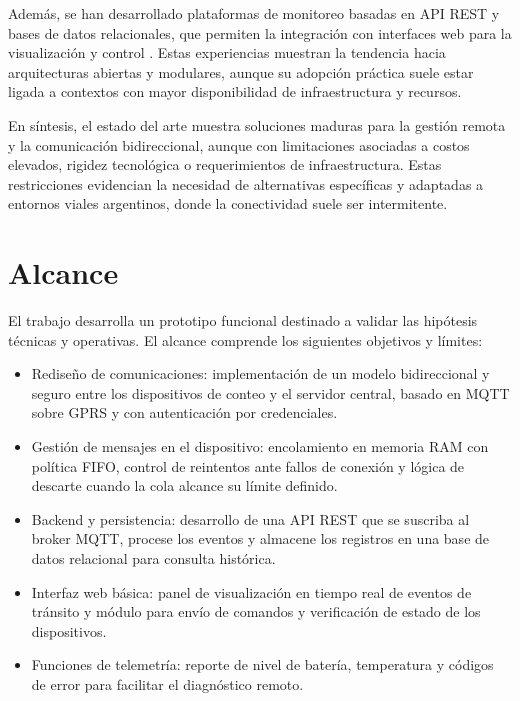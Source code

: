 Además, se han desarrollado plataformas de monitoreo basadas en API REST y bases de datos relacionales, que permiten la integración con interfaces web para la visualización y control \cite{openRemoteSolution}. Estas experiencias muestran la tendencia hacia arquitecturas abiertas y modulares, aunque su adopción práctica suele estar ligada a contextos con mayor disponibilidad de infraestructura y recursos.

En síntesis, el estado del arte muestra soluciones maduras para la gestión remota y la comunicación bidireccional, aunque con limitaciones asociadas a costos elevados, rigidez tecnológica o requerimientos de infraestructura. Estas restricciones evidencian la necesidad de alternativas específicas y adaptadas a entornos viales argentinos, donde la conectividad suele ser intermitente.


\section{Alcance}
El trabajo desarrolla un prototipo funcional destinado a validar las hipótesis técnicas y operativas. El alcance comprende los siguientes objetivos y límites:

\begin{itemize}

\item Rediseño de comunicaciones: implementación de un modelo bidireccional y seguro entre los dispositivos de conteo y el servidor central, basado en MQTT sobre GPRS y con autenticación por credenciales.

\item Gestión de mensajes en el dispositivo: encolamiento en memoria RAM con política FIFO, control de reintentos ante fallos de conexión y lógica de descarte cuando la cola alcance su límite definido.

\item Backend y persistencia: desarrollo de una API REST que se suscriba al broker MQTT, procese los eventos y almacene los registros en una base de datos relacional para consulta histórica.

\item Interfaz web básica: panel de visualización en tiempo real de eventos de tránsito y módulo para envío de comandos y verificación de estado de los dispositivos.

\item Funciones de telemetría: reporte de nivel de batería, temperatura y códigos de error para facilitar el diagnóstico remoto.

\end{itemize}

